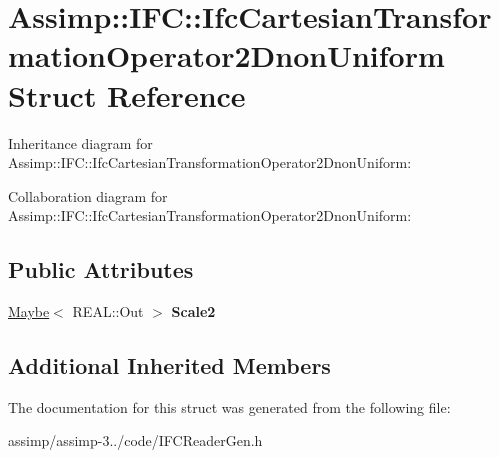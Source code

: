 \hypertarget{struct_assimp_1_1_i_f_c_1_1_ifc_cartesian_transformation_operator2_dnon_uniform}{\section{Assimp\+:\+:I\+F\+C\+:\+:Ifc\+Cartesian\+Transformation\+Operator2\+Dnon\+Uniform Struct Reference}
\label{struct_assimp_1_1_i_f_c_1_1_ifc_cartesian_transformation_operator2_dnon_uniform}
}


Inheritance diagram for Assimp\+:\+:I\+F\+C\+:\+:Ifc\+Cartesian\+Transformation\+Operator2\+Dnon\+Uniform\+:


Collaboration diagram for Assimp\+:\+:I\+F\+C\+:\+:Ifc\+Cartesian\+Transformation\+Operator2\+Dnon\+Uniform\+:
\subsection*{Public Attributes}
\begin{DoxyCompactItemize}
\item 
\hypertarget{struct_assimp_1_1_i_f_c_1_1_ifc_cartesian_transformation_operator2_dnon_uniform_a5d13d6662636b618c61c00cc7ecddbff}{\hyperlink{struct_assimp_1_1_s_t_e_p_1_1_maybe}{Maybe}$<$ R\+E\+A\+L\+::\+Out $>$ {\bfseries Scale2}}\label{struct_assimp_1_1_i_f_c_1_1_ifc_cartesian_transformation_operator2_dnon_uniform_a5d13d6662636b618c61c00cc7ecddbff}

\end{DoxyCompactItemize}
\subsection*{Additional Inherited Members}


The documentation for this struct was generated from the following file\+:\begin{DoxyCompactItemize}
\item 
assimp/assimp-\/3../code/I\+F\+C\+Reader\+Gen.\+h\end{DoxyCompactItemize}
